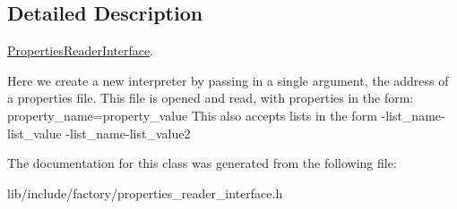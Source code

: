 \subsection{Detailed Description}
\hyperlink{classPropertiesReaderInterface}{Properties\-Reader\-Interface}. 

Here we create a new interpreter by passing in a single argument, the address of a properties file. This file is opened and read, with properties in the form\-: property\-\_\-name=property\-\_\-value This also accepts lists in the form -\/list\-\_\-name-\/list\-\_\-value -\/list\-\_\-name-\/list\-\_\-value2 

The documentation for this class was generated from the following file\-:\begin{DoxyCompactItemize}
\item 
lib/include/factory/properties\-\_\-reader\-\_\-interface.\-h\end{DoxyCompactItemize}
